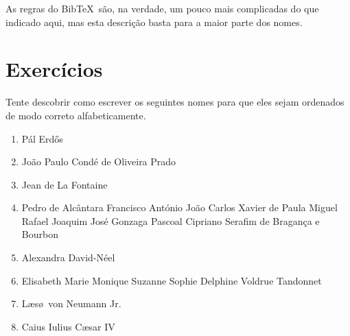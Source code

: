 \documentclass[article,openany]{memoir}
\begin{document}
As regras do Bib\TeX\ são, na verdade, um pouco mais complicadas do
que indicado aqui, mas esta descrição basta para a maior parte dos
nomes.

\chapter{Exercícios}

Tente descobrir como escrever os seguintes nomes para que eles sejam
ordenados de modo correto alfabeticamente.
\begin{enumerate}
\item Pál Erd\H os
\item João Paulo Condé de Oliveira Prado
\item Jean de La Fontaine
\item Pedro de Alcântara Francisco António João Carlos Xavier de Paula Miguel Rafael Joaquim José Gonzaga Pascoal Cipriano Serafim de Bragança e Bourbon
\item Alexandra David-Néel
\item Elisabeth Marie Monique Suzanne Sophie Delphine Voldrue Tandonnet
\item L\ae s\o\ von Neumann Jr.
\item Caius Iulius C\ae sar IV
\end{enumerate}
\end{document}
